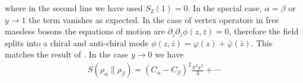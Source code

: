 \documentclass[11pt]{article}
\newcommand{\nn}{\nonumber}
\newcommand{\lb}{\left(}
\newcommand{\rb}{\right)}
\newcommand{\NL}[1]{\textcolor{blue}{#1}}
\begin{document}
  where in the second line we have used $S_{2}(1)=0$. In the special case,
  $\alpha =\beta$ or $y\to 1$ the term vanishes as expected. In the case of vertex
  operators in free massless bosons the equations of motion are $\partial_z\partial_{\bar{z}}\phi(z,\bar{z})=0$, therefore the field splits into a chiral and anti-chiral mode $\phi(z,\bar{z})=\varphi(z)+\bar{\varphi}(\bar{z})$. This matches the result of \cite{Lashkari_2014,S_rosi_2016}. In the case $y\to 0$ we have
 \begin{align}
  S(\rho_\alpha\|\rho_\beta)=(C_\alpha-C_\beta)^2\frac{\pi^2 x^2}{3}+\cdots 
 \end{align}

  

\end{document}
